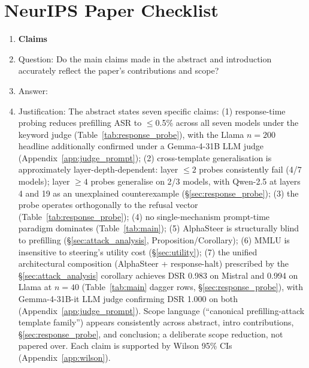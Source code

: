 \section*{NeurIPS Paper Checklist}

\begin{enumerate}

\item {\bf Claims}
    \item[] Question: Do the main claims made in the abstract and introduction accurately reflect the paper's contributions and scope?
    \item[] Answer: \answerYes{}
    \item[] Justification: The abstract states seven specific claims: (1) response-time probing reduces prefilling ASR to $\leq$0.5\% across all seven models under the keyword judge (Table~\ref{tab:response_probe}), with the Llama $n=200$ headline additionally confirmed under a Gemma-4-31B LLM judge (Appendix~\ref{app:judge_prompt}); (2) cross-template generalisation is approximately layer-depth-dependent: layer $\leq 2$ probes consistently fail (4/7 models); layer $\geq 4$ probes generalise on 2/3 models, with Qwen-2.5 at layers 4 and 19 as an unexplained counterexample (\S\ref{sec:response_probe}); (3) the probe operates orthogonally to the refusal vector (Table~\ref{tab:response_probe}); (4) no single-mechanism prompt-time paradigm dominates (Table~\ref{tab:main}); (5) AlphaSteer is structurally blind to prefilling (\S\ref{sec:attack_analysis}, Proposition/Corollary); (6) MMLU is insensitive to steering's utility cost (\S\ref{sec:utility}); (7) the unified architectural composition (AlphaSteer + response-halt) prescribed by the \S\ref{sec:attack_analysis} corollary achieves DSR 0.983 on Mistral and 0.994 on Llama at $n=40$ (Table~\ref{tab:main} dagger rows, \S\ref{sec:response_probe}), with Gemma-4-31B-it LLM judge confirming DSR 1.000 on both (Appendix~\ref{app:judge_prompt}). Scope language (``canonical prefilling-attack template family'') appears consistently across abstract, intro contributions, \S\ref{sec:response_probe}, and conclusion; a deliberate scope reduction, not papered over. Each claim is supported by Wilson 95\% CIs (Appendix~\ref{app:wilson}).


\end{enumerate}
